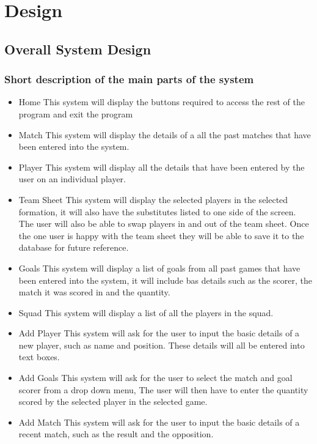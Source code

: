 \chapter{Design}

\section{Overall System Design}

\subsection{Short description of the main parts of the system}
\begin{itemize}
\item Home
This system will display the buttons required to  access the rest of the program and exit the program
\item Match
This system will display the details of a all the past matches that have been entered into the system. 
\item Player 
This system  will display all the details that have been entered by the user on an individual player.  
\item Team Sheet
This system will display the selected players in the selected formation, it will also have the substitutes listed to one side of the screen. The user will also be able to swap players in and out of the team sheet. Once the one user is happy with the team sheet they will be able to save it to the database for future reference. 
\item Goals
This system will display a list of goals from all past games that have been entered into the system, it will include bas details such as the scorer, the match it was scored in and the quantity.
\item Squad
This system will display a list of all the players in the squad.
\item Add Player
This system will ask for the user to input the basic details of a new player, such as name and position. These details will all be entered into text boxes.
\item Add Goals
This system will ask for the user to select the match and goal scorer from a drop down menu, The user will then have to enter the quantity scored by the selected player in the selected game. 
\item Add Match
This system will ask for the user to input the basic details of a recent match, such as the result and the opposition.

\end{itemize}
